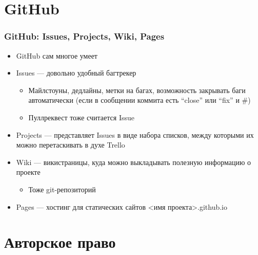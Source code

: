 \documentclass{../../slides-style}
\begin{document}
    \section{GitHub}

    \begin{frame}
        \frametitle{GitHub: Issues, Projects, Wiki, Pages}
        \begin{itemize}
            \item GitHub сам многое умеет
            \item Issues --- довольно удобный багтрекер
            \begin{itemize}
                \item Майлстоуны, дедлайны, метки на багах, возможность закрывать баги автоматически (если в сообщении коммита есть ``close'' или ``fix'' и \#<номер бага>)
                \item Пуллреквест тоже считается Issue
            \end{itemize}
            \item Projects --- представляет Issues в виде набора списков, между которыми их можно перетаскивать в духе Trello
            \item Wiki --- викистраницы, куда можно выкладывать полезную информацию о проекте
            \begin{itemize}
                \item Тоже git-репозиторий
            \end{itemize}
            \item Pages --- хостинг для статических сайтов <имя проекта>.github.io
        \end{itemize}
    \end{frame}

    \section{Авторское право}
\end{document}
